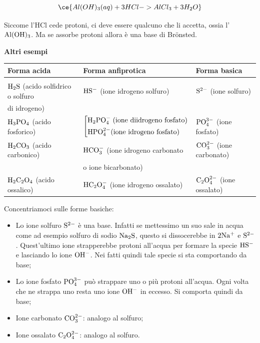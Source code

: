 $$\ce{Al(OH)_3(aq) + 3HCl -> AlCl_3 + 3H_2O}$$

Siccome l'HCl cede protoni, ci deve essere qualcuno che li accetta, ossia l'$\rm Al(OH)_3$. Ma se assorbe protoni allora è una base di Brönsted.

\vspace{0.2cm}\textbf{Altri esempi}

\vspace{-0.3cm}\begin{center}
    \footnotesize\begin{tabular}{|p{5.2cm}p{5.4cm}p{3.8cm}|}
    \hline
    \textbf{Forma acida} & \textbf{Forma anfiprotica} & \textbf{Forma basica}\\
    \hline
    &&\\[-1.2ex]
    $\rm H_2S$ (acido solfidrico o solfuro & $\rm HS^-$ (ione idrogeno solfuro) & $\rm S^{2-}$ (ione solfuro)\\
    di idrogeno)&&\\[0.7ex]
    $\rm H_3PO_4$ (acido fosforico) &  \hspace{-0.2cm}$\left[
\begin{aligned}
    \text{H}_2\text{PO}_4^- \; \text{(ione diidrogeno fosfato)}\\
    \text{HPO}_4^{2-} \text{(ione idrogeno fosfato)} \hspace{0.4cm}
\end{aligned}
\right .$
 & $\rm PO_4^{3-}$ (ione fosfato)\\[3ex]
 $\rm H_2CO_3$ (acido carbonico) & $\rm HCO_3^-$ (ione idrogeno carbonato& $\rm CO_3^{2-}$ (ione carbonato)\\
 & o ione bicarbonato) &\\[0.7ex]
 $\rm H_2C_2O_4$ (acido ossalico) & $\rm HC_2O_4^-$ (ione idrogeno ossalato) & $\rm C_2O_4^{2-}$ (ione ossalato)\\[0.7ex]
 \hline
    \end{tabular}
\end{center}

Concentriamoci sulle forme basiche:

\begin{itemize}
    \item Lo ione solfuro $\rm S^{2-}$ è una base. Infatti se mettessimo un suo sale in acqua come ad esempio solfuro di sodio $\rm Na_2S$, questo si dissocerebbe in $\rm 2Na^+$ e $\rm S^{2-}$. Quest'ultimo ione strapperebbe protoni all'acqua per formare la specie $\rm HS^-$ e lasciando lo ione $\rm OH^-$. Nei fatti quindi tale specie si sta comportando da base;
    \item Lo ione fosfato $\rm PO_4^{3-}$ può strappare uno o più protoni all'acqua. Ogni volta che ne strappa uno resta uno ione $\rm OH^-$ in eccesso. Si comporta quindi da base;
    \item Ione carbonato $\rm CO_3^{2-}$: analogo al solfuro;
    \item Ione ossalato $\rm C_2O_4^{2-}$: analogo al solfuro.
\end{itemize}

